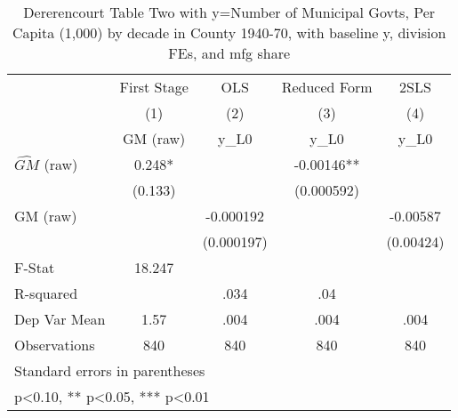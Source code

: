 \begin{table}[htbp]\centering
\def\sym#1{\ifmmode^{#1}\else\(^{#1}\)\fi}
\caption{Dererencourt Table Two with y=Number of Municipal Govts, Per Capita (1,000) by decade in County 1940-70, with baseline y, division FEs, and mfg share}
\begin{tabular}{l*{4}{c}}
\toprule
                    & First Stage   &         OLS   &Reduced Form   &        2SLS   \\
                    &\multicolumn{1}{c}{(1)}&\multicolumn{1}{c}{(2)}&\multicolumn{1}{c}{(3)}&\multicolumn{1}{c}{(4)}\\
                    &\multicolumn{1}{c}{GM  (raw)}&\multicolumn{1}{c}{y\_L0}&\multicolumn{1}{c}{y\_L0}&\multicolumn{1}{c}{y\_L0}\\
\midrule
$\hat{GM}$ (raw)    &       0.248*  &               &    -0.00146** &               \\
                    &     (0.133)   &               &  (0.000592)   &               \\
\addlinespace
GM  (raw)           &               &   -0.000192   &               &    -0.00587   \\
                    &               &  (0.000197)   &               &   (0.00424)   \\
\midrule
F-Stat              &      18.247   &               &               &               \\
R-squared           &               &        .034   &         .04   &               \\
Dep Var Mean        &        1.57   &        .004   &        .004   &        .004   \\
Observations        &         840   &         840   &         840   &         840   \\
\bottomrule
\multicolumn{5}{l}{\footnotesize Standard errors in parentheses}\\
\multicolumn{5}{l}{\footnotesize * p<0.10, ** p<0.05, *** p<0.01}\\
\end{tabular}
\end{table}
